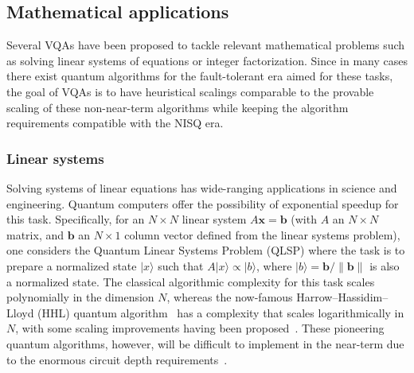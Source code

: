 \documentclass[prx,twocolumn,floatfix,superscriptaddress,longbibliography]{revtex4-1}
\renewcommand{\vec}[1]{\boldsymbol{#1}}  %
\newcommand{\<}{\langle}
\renewcommand{\>}{\rangle}
\newcommand{\ket}[1]{|#1\rangle}               %
\renewcommand{\vec}[1]{\boldsymbol{#1}}  %
\begin{document}
\subsection{ Mathematical applications}

Several VQAs have been proposed to tackle relevant mathematical problems such as solving linear systems of equations or integer factorization. Since in many cases there exist quantum algorithms for the fault-tolerant era aimed for these tasks, the goal of VQAs is to have heuristical scalings comparable to the provable scaling of these non-near-term algorithms while keeping the algorithm requirements compatible with the NISQ era.   

\subsubsection{ Linear systems} Solving systems of linear equations has wide-ranging applications in science and engineering. 
Quantum computers offer the possibility of exponential speedup for this task. Specifically, for an $N\times N$ linear system $A\vec{x} =\vec{b}$ (with $A$  an $N\times N$ matrix, and $\vec{b}$ an $N\times 1$ column vector defined from the linear systems problem), one considers the Quantum Linear Systems Problem (QLSP) where the task is to prepare a normalized state $\ket{x}$ such that $A\ket{x} \propto \ket{b}$, where $\ket{b}=\vec{b}/\|\vec{b}\|$ is also a normalized state. The classical algorithmic complexity for this task scales polynomially in the dimension $N$, whereas the now-famous Harrow--Hassidim--Lloyd (HHL) quantum algorithm~\cite{harrow2009quantum} has a complexity that scales logarithmically in $N$, with some scaling improvements having been proposed~\cite{Ambainis,Yigit,CKS,Chakraborty}. These pioneering quantum algorithms, however, will be difficult to implement in the near-term due to the enormous circuit depth requirements~\cite{scherer2017concrete}. 
\end{document}
